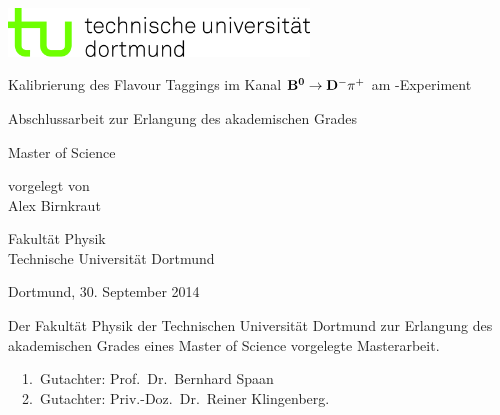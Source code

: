 
\begin{titlepage}
\includegraphics[width=8cm]{tud_logo_cmyk.jpg}
\vspace*{15ex}
{%
\Huge \sffamily \bfseries 
\begin{center}
Kalibrierung des Flavour Taggings im Kanal $\mathbf{{{B}^0}\rightarrow{\ensuremath{{D}^-}}{\ensuremath{{\pi}^+}}}$ am \lhcb-Experiment
\end{center} 
}%

\begin{otherlanguage}{german}
{%
\LARGE \sffamily %
\begin{center}
Abschlussarbeit zur Erlangung des akademischen Grades\\
\end{center}
}

{%
\LARGE \sffamily %
\begin{center}
Master of Science
\end{center}
}

\vspace{5ex}


{%
\Large \sffamily
\begin{center}
vorgelegt von \\[0.8ex]
Alex Birnkraut 
\end{center}
}
\vspace{5ex}
{%
\Large \sffamily
\begin{center}
Fakultät Physik\\
Technische Universität Dortmund
\end{center}
}
\vspace{4ex}
{%
\Large \sffamily
\begin{center}
Dortmund, 30. September 2014
\end{center}
}

\clearpage
\thispagestyle{empty}
\vspace*{\fill}
\noindent Der Fakultät Physik der Technischen Universität Dortmund zur Erlangung
des akademischen Grades eines Master of Science vorgelegte
Masterarbeit.\\

\parbox{\textwidth}{
  1.~Gutachter: Prof.~Dr.~Bernhard Spaan \\
  2.~Gutachter: Priv.-Doz.~Dr.~Reiner Klingenberg.\\
}
\end{otherlanguage}
\end{titlepage}
\setcounter{page}{1}